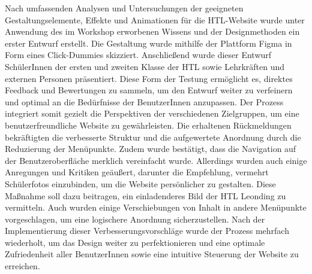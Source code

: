 Nach umfassenden Analysen und Untersuchungen der geeigneten Gestaltungselemente, Effekte und Animationen für die HTL-Website wurde unter Anwendung des im Workshop 
erworbenen Wissens und der Designmethoden ein erster Entwurf erstellt. Die Gestaltung wurde mithilfe der Plattform Figma in Form eines 
Click-Dummies skizziert. Anschließend wurde dieser Entwurf SchülerInnen der ersten und zweiten Klasse der HTL sowie Lehrkräften 
und externen Personen präsentiert. Diese Form der Testung ermöglicht es, direktes Feedback und Bewertungen zu sammeln, um den Entwurf 
weiter zu verfeinern und optimal an die Bedürfnisse der BenutzerInnen anzupassen. Der Prozess integriert somit gezielt die Perspektiven 
der verschiedenen Zielgruppen, um eine benutzerfreundliche Website zu gewährleisten. 
Die erhaltenen Rückmeldungen bekräftigten die verbesserte Struktur und die aufgewertete Anordnung durch die Reduzierung der Menüpunkte. 
Zudem wurde bestätigt, dass die Navigation auf der Benutzeroberfläche merklich vereinfacht wurde. Allerdings wurden auch einige Anregungen 
und Kritiken geäußert, darunter die Empfehlung, vermehrt Schülerfotos einzubinden, um die Website persönlicher zu gestalten. Diese Maßnahme 
soll dazu beitragen, ein einladenderes Bild der HTL Leonding zu vermitteln. Auch wurden einige Verschiebungen von Inhalt in andere Menüpunkte 
vorgeschlagen, um eine logischere Anordnung sicherzustellen. 
Nach der Implementierung dieser Verbesserungsvorschläge wurde der Prozess mehrfach wiederholt, um das Design weiter zu perfektionieren und 
eine optimale Zufriedenheit aller BenutzerInnen sowie eine intuitive Steuerung der Website zu erreichen. 
